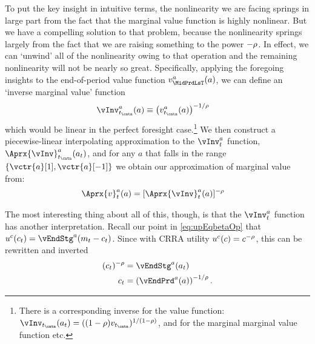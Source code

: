 \documentclass[SolvingMicroDSOPs]{subfiles}
\begin{document}
To put the key insight in intuitive terms, the nonlinearity we are facing springs in large part from the fact that the marginal value function is highly nonlinear.  But we have a compelling solution to that problem, because the nonlinearity springs largely from the fact that we are raising something to the power $-\rho$.  In effect, we can `unwind' all of the nonlinearity owing to that operation and the remaining nonlinearity will not be nearly so great.  Specifically, applying the foregoing insights to the end-of-period value function $\vFunc^{a}_{\MidPrdLsT}(\aNrm)$, we can define an `inverse marginal value' function
\begin{equation}\begin{gathered}\begin{aligned}
      \vInv_{\prd_\cntn}^{a}(a)  & \equiv  \left(\vFunc^{a}_{\prd_\cntn}(a)\right)^{-1/\CRRA} \label{eq:cGoth}
    \end{aligned}\end{gathered}\end{equation}
which would be linear in the perfect foresight case.\footnote{There is a corresponding inverse for the value function: $\vInv_{\prd_\cntn}(a_{\prd})=((1-\CRRA)\vFunc_{\prd_\cntn})^{1/(1-\CRRA)}$, and for the marginal marginal value function etc.}  We then construct a piecewise-linear interpolating approximation to the $\vInv_{\prd}^{a}$ function, $\Aprx{\vInv}_{\prd_\cntn}^{a}(a_{\prd})$, and for any $a$ that falls in the range $\{\vctr{a}[1],\vctr{a}[-1]\}$ we obtain our approximation of marginal value from:
\begin{equation}\begin{gathered}\begin{aligned}
      \Aprx{\vFunc}_{\prd}^{a}(a) & =
      [\Aprx{\vInv}_{\prd}^{a}(a)]^{-\CRRA}
    \end{aligned}\end{gathered}\end{equation}

The most interesting thing about all of this, though, is that the $\vInv^{a}_{\prd}$ function has another interpretation. Recall our point in \eqref{eq:upEqbetaOp} that $\uFunc^{c}(c_{\prd}) = \vEndStg^{a}(m_{\prd}-c_{\prd})$.  Since with CRRA utility $u^{c}(c)=c^{-\rho}$, this can be rewritten
and inverted
\begin{equation}\begin{gathered}\begin{aligned}
      (c_{\prd})^{-\CRRA} & = \vEndStg^{a}(a_{\prd})
      \\ c_{\prd} & =      \left(\vEndPrd^{a}(a)\right)^{-1/\CRRA}.
    \end{aligned}\end{gathered}\end{equation}
\end{document}
